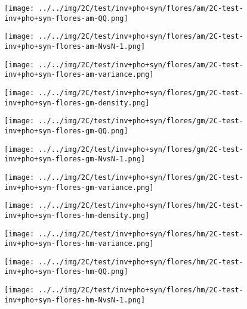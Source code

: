 \begin{figure}[H]
\centering	\texttt{[image: ../../img/2C/test/inv+pho+syn/flores/am/2C-test-inv+pho+syn-flores-am-QQ.png]}
\end{figure}
\begin{figure}[H]
\centering	\texttt{[image: ../../img/2C/test/inv+pho+syn/flores/am/2C-test-inv+pho+syn-flores-am-NvsN-1.png]}
\end{figure}
\begin{figure}[H]
\centering	\texttt{[image: ../../img/2C/test/inv+pho+syn/flores/am/2C-test-inv+pho+syn-flores-am-variance.png]}
\end{figure}
\begin{figure}[H]
\centering	\texttt{[image: ../../img/2C/test/inv+pho+syn/flores/gm/2C-test-inv+pho+syn-flores-gm-density.png]}
\end{figure}
\begin{figure}[H]
\centering	\texttt{[image: ../../img/2C/test/inv+pho+syn/flores/gm/2C-test-inv+pho+syn-flores-gm-QQ.png]}
\end{figure}
\begin{figure}[H]
\centering	\texttt{[image: ../../img/2C/test/inv+pho+syn/flores/gm/2C-test-inv+pho+syn-flores-gm-NvsN-1.png]}
\end{figure}
\begin{figure}[H]
\centering	\texttt{[image: ../../img/2C/test/inv+pho+syn/flores/gm/2C-test-inv+pho+syn-flores-gm-variance.png]}
\end{figure}
\begin{figure}[H]
\centering	\texttt{[image: ../../img/2C/test/inv+pho+syn/flores/hm/2C-test-inv+pho+syn-flores-hm-density.png]}
\end{figure}
\begin{figure}[H]
\centering	\texttt{[image: ../../img/2C/test/inv+pho+syn/flores/hm/2C-test-inv+pho+syn-flores-hm-variance.png]}
\end{figure}
\begin{figure}[H]
\centering	\texttt{[image: ../../img/2C/test/inv+pho+syn/flores/hm/2C-test-inv+pho+syn-flores-hm-QQ.png]}
\end{figure}
\begin{figure}[H]
\centering	\texttt{[image: ../../img/2C/test/inv+pho+syn/flores/hm/2C-test-inv+pho+syn-flores-hm-NvsN-1.png]}
\end{figure}
